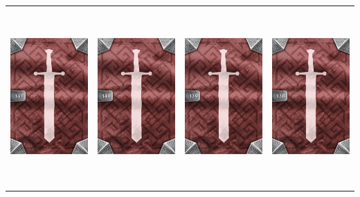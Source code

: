 \documentclass{minimal}
\begin{document}
{\begin{longtable}{llll}
\includegraphics[width=44mm,height=68mm]{./64-151/gh-141-utility-belt-back.png} &
\includegraphics[width=44mm,height=68mm]{./64-151/gh-140-sun-shield-back.png} &
\includegraphics[width=44mm,height=68mm]{./64-151/gh-139-psychic-knife-back.png} &
\includegraphics[width=44mm,height=68mm]{./64-151/gh-138-stone-charm-back.png}\\ 

\end{longtable}}
\end{document}
